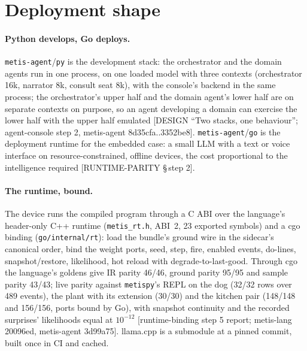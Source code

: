 \documentclass[11pt]{article}
\newcommand{\metispy}{\texttt{metispy}}
\newcommand{\agent}{\texttt{metis-agent}}
\newcommand{\src}[1]{{\footnotesize\textsf{[#1]}}}
\begin{document}
\section{Deployment shape}\label{sec:deploy}

\paragraph{Python develops, Go deploys.} \agent{}/\texttt{py} is the development stack:
the orchestrator and the domain agents run in one process, on one loaded model with three
contexts (orchestrator 16k, narrator 8k, consult seat 8k), with the console's backend in the
same process; the orchestrator's upper half and the domain agent's lower half are on separate
contexts on purpose, so an agent developing a domain can exercise the lower half with the
upper half emulated \src{DESIGN ``Two stacks, one behaviour''; agent-console step 2,
metis-agent 8d35cfa..3352be8}. \agent{}/\texttt{go} is the deployment runtime for the
embedded case: a small LLM with a text or voice interface on resource-constrained, offline
devices, the cost proportional to the intelligence required \src{RUNTIME-PARITY \S\,step 2}.

\paragraph{The runtime, bound.} The device runs the compiled program through a C ABI over
the language's header-only C++ runtime (\texttt{metis\_rt.h}, ABI~2, 23 exported symbols)
and a cgo binding (\texttt{go/internal/rt}): load the bundle's ground wire in the sidecar's
canonical order, bind the weight ports, seed, step, fire, enabled events, do-lines,
snapshot/restore, likelihood, hot reload with degrade-to-last-good. Through cgo the
language's goldens give IR parity 46/46, ground parity 95/95 and sample parity 43/43; live
parity against \metispy{}'s REPL on the dog (32/32 rows over 489 events), the plant with its
extension (30/30) and the kitchen pair (148/148 and 156/156, ports bound by Go), with
snapshot continuity and the recorded surprises' likelihoods equal at $10^{-12}$
\src{runtime-binding step 5 report; metis-lang 20096ed, metis-agent 3d99a75}. llama.cpp is
a submodule at a pinned commit, built once in CI and cached.
\end{document}
